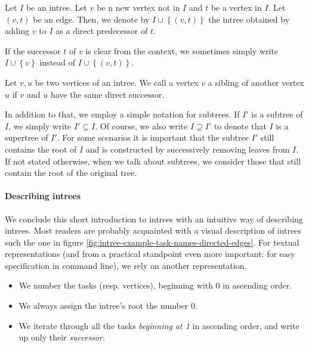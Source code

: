 \begin{definition}
  Let $I$ be an intree. Let $v$ be n new vertex not in $I$ and $t$ be a vertex in $I$. Let $(v,t)$ be an edge. Then, we denote by $I\cup\left\{ (v,t) \right\}$ the intree obtained by adding $v$ to $I$ as a direct predecessor of $t$.

  If the successor $t$ of $v$ is clear from the context, we sometimes simply write $I\cup\left\{ v \right\}$ instead of $I\cup\left\{ (v,t) \right\}$.
\end{definition}

\begin{definition}[Siblings]
  Let $v,u$ be two vertices of an intree. We call a vertex $v$ a sibling of another vertex $u$ if $v$ and $u$ have the same direct successor.
\end{definition}

In addition to that, we employ a simple notation for subtrees. If $I'$ is a subtree of $I$, we simply write $I'\subseteq I$. Of course, we also write $I\supseteq I'$ to denote that $I$ is a supertree of $I'$. For some scenarios it is important that the subtree $I'$ still contains the root of $I$ and is constructed by successively removing leaves from $I$. If not stated otherwise, when we talk about subtrees, we consider those that still contain the root of the original tree.

\paragraph{Describing intrees}

We conclude this short introduction to intrees with an intuitive way of describing intrees. Most readers are probably acquainted with a visual description of intrees such the one in figure \ref{fig:intree-example-task-names-directed-edges}. For textual representations (and from a practical standpoint even more important: for easy specification in command line), we rely on another representation. 

\begin{itemize}
\item We number the tasks (resp. vertices), beginning with 0 in
  ascending order.
\item We always assign the intree's root the number 0.
\item We iterate through all the tasks \emph{beginning at 1} in ascending order, and write up only their \emph{successor}.
\end{itemize}

